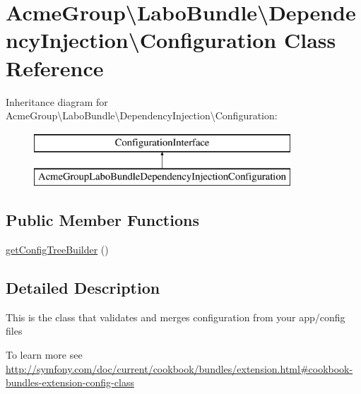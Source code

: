 \hypertarget{class_acme_group_1_1_labo_bundle_1_1_dependency_injection_1_1_configuration}{\section{Acme\+Group\textbackslash{}Labo\+Bundle\textbackslash{}Dependency\+Injection\textbackslash{}Configuration Class Reference}
\label{class_acme_group_1_1_labo_bundle_1_1_dependency_injection_1_1_configuration}
}
Inheritance diagram for Acme\+Group\textbackslash{}Labo\+Bundle\textbackslash{}Dependency\+Injection\textbackslash{}Configuration\+:\begin{figure}[H]
\begin{center}
\leavevmode
\includegraphics[height=2.000000cm]{class_acme_group_1_1_labo_bundle_1_1_dependency_injection_1_1_configuration}
\end{center}
\end{figure}
\subsection*{Public Member Functions}
\begin{DoxyCompactItemize}
\item 
\hyperlink{class_acme_group_1_1_labo_bundle_1_1_dependency_injection_1_1_configuration_ad5b09f526e9d93cffc663df111237148}{get\+Config\+Tree\+Builder} ()
\end{DoxyCompactItemize}


\subsection{Detailed Description}
This is the class that validates and merges configuration from your app/config files

To learn more see \hyperlink{}{http\+://symfony.\+com/doc/current/cookbook/bundles/extension.\+html\#cookbook-\/bundles-\/extension-\/config-\/class} 


